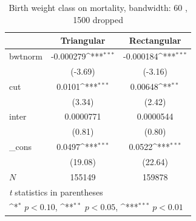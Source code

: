 \documentclass[a4paper,11pt]{article}
\begin{document}
\begin{table}[htbp]\centering
\def\sym#1{\ifmmode^{#1}\else\(^{#1}\)\fi}
\caption{Birth weight class on mortality, bandwidth: 60 , 1500 dropped}
\label{B2.bw60}
\begin{tabular}{l*{2}{c}}
\hline\hline
            &\multicolumn{1}{c}{Triangular}&\multicolumn{1}{c}{Rectangular}\\
\hline
bwtnorm     &   -0.000279\sym{***}&   -0.000184\sym{***}\\
            &     (-3.69)         &     (-3.16)         \\
[1em]
cut         &      0.0101\sym{***}&     0.00648\sym{**} \\
            &      (3.34)         &      (2.42)         \\
[1em]
inter       &   0.0000771         &   0.0000544         \\
            &      (0.81)         &      (0.80)         \\
[1em]
\_cons      &      0.0497\sym{***}&      0.0522\sym{***}\\
            &     (19.08)         &     (22.64)         \\
\hline
\(N\)       &      155149         &      159878         \\
\hline\hline
\multicolumn{3}{l}{\footnotesize \textit{t} statistics in parentheses}\\
\multicolumn{3}{l}{\footnotesize \sym{*} \(p<0.10\), \sym{**} \(p<0.05\), \sym{***} \(p<0.01\)}\\
\end{tabular}
\end{table}


\end{document}
